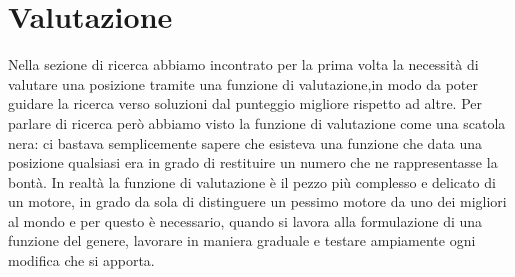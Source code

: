 \section{Valutazione}
Nella sezione di ricerca abbiamo incontrato per la prima volta la necessità di valutare una posizione tramite una funzione di valutazione,in modo da poter guidare la ricerca verso soluzioni dal punteggio 
migliore rispetto ad altre. Per parlare di ricerca però abbiamo visto la funzione di valutazione come una scatola nera: ci bastava semplicemente sapere che esisteva una funzione che data una posizione qualsiasi 
era in grado di restituire un numero che ne rappresentasse la bontà. In realtà la funzione di valutazione è il pezzo più complesso e delicato di un motore, in grado da sola di distinguere un pessimo motore
da uno dei migliori al mondo e per questo è necessario, quando si lavora alla formulazione di una funzione del genere, lavorare in maniera graduale e testare ampiamente ogni modifica che si apporta.

